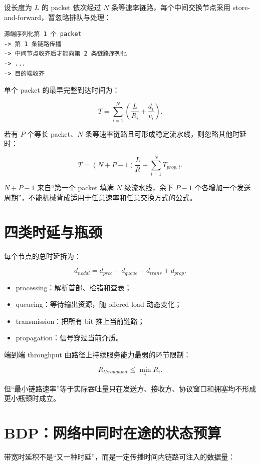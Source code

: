 \documentclass[UTF8,fontset=none,11pt,a4paper]{ctexart}
\providecommand{\tightlist}{\setlength{\itemsep}{0pt}\setlength{\parskip}{0pt}}
\begin{document}
设长度为 \(L\) 的 packet 依次经过 \(N\)
条等速率链路，每个中间交换节点采用 store-and-forward，暂忽略排队与处理：

\begin{lstlisting}
源端序列化第 1 个 packet
-> 第 1 条链路传播
-> 中间节点收齐后才能向第 2 条链路序列化
-> ...
-> 目的端收齐
\end{lstlisting}

单个 packet 的最早完整到达时间为：

\[
T=\sum_{i=1}^{N}\left(\frac{L}{R_i}+\frac{d_i}{v_i}\right).
\]

若有 \(P\) 个等长 packet、\(N\)
条等速率链路且可形成稳定流水线，则忽略其他时延时：

\[
T=(N+P-1)\frac{L}{R}+\sum_{i=1}^{N}T_{prop,i}.
\]

\(N+P-1\) 来自``第一个 packet 填满 \(N\) 级流水线，余下 \(P-1\)
个各增加一个发送周期''，不能机械背成适用于任意速率和任意交换方式的公式。

\section{四类时延与瓶颈}\label{6-ux56dbux7c7bux65f6ux5ef6ux4e0eux74f6ux9888}

每个节点的总时延拆为：

\[
d_{nodal}=d_{proc}+d_{queue}+d_{trans}+d_{prop}.
\]

\begin{itemize}
\tightlist
\item
  processing：解析首部、检错和查表；
\item
  queueing：等待输出资源，随 offered load 动态变化；
\item
  transmission：把所有 bit 推上当前链路；
\item
  propagation：信号穿过当前介质。
\end{itemize}

端到端 throughput 由路径上持续服务能力最弱的环节限制：

\[
R_{throughput}\le \min_i R_i.
\]

但``最小链路速率''等于实际吞吐量只在发送方、接收方、协议窗口和拥塞均不形成更小瓶颈时成立。

\section{BDP：网络中同时在途的状态预算}\label{7-bdpux7f51ux7edcux4e2dux540cux65f6ux5728ux9014ux7684ux72b6ux6001ux9884ux7b97}

带宽时延积不是``又一种时延''，而是一定传播时间内链路可注入的数据量：
\end{document}
